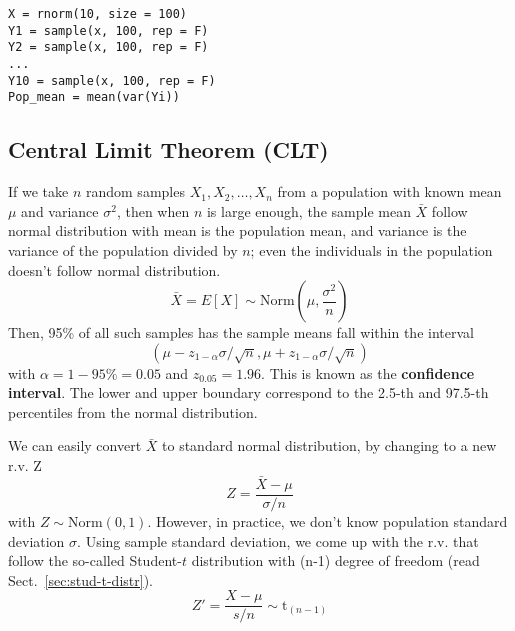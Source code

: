 \begin{lstlisting}
X = rnorm(10, size = 100)
Y1 = sample(x, 100, rep = F)
Y2 = sample(x, 100, rep = F)
...
Y10 = sample(x, 100, rep = F)
Pop_mean = mean(var(Yi))
\end{lstlisting}

\subsection{Central Limit Theorem (CLT)}
\label{sec:centr-limit-theor}

If we take $n$ random samples $X_1,X_2,\dots, X_n$ from a population
with known mean $\mu$ and variance $\sigma^2$, then when $n$ is large
enough, the sample mean $\bar{X}$ follow normal distribution with mean
is the population mean, and variance is the variance of the population
divided by $n$; even the individuals in the population doesn't follow
normal distribution.
\begin{equation}
  \label{eq:27}
  \bar{X} =  E[X]  \sim \text{Norm}(\mu,\frac{\sigma^2}{n})
\end{equation}
Then, 95\% of all such samples has the sample means fall within the
interval 
\begin{equation}
  \label{eq:37}
  (\mu- z_{1-\alpha} \sigma/\sqrt{n}, \mu+z_{1-\alpha} \sigma/\sqrt{n})
\end{equation}
with $\alpha=1-95\%=0.05$ and $z_{0.05}=1.96$. This is known as the
{\bf confidence interval}. The lower and upper boundary correspond to
the 2.5-th and 97.5-th percentiles from the normal distribution. 

We can easily convert $\bar{X}$ to standard normal distribution, by
changing to a new r.v. Z
\begin{equation}
  \label{eq:28}
  Z = \frac{\bar{X}-\mu}{\sigma/n}
\end{equation}
with $Z \sim \text{Norm}(0,1)$. However, in practice, we don't know
population standard deviation $\sigma$. Using sample standard
deviation, we come up with the r.v. that follow the so-called
Student-$t$ distribution with (n-1) degree of freedom (read
Sect.~\ref{sec:stud-t-distr}).
\begin{equation}
  \label{eq:29}
  Z' = \frac{X-\mu}{s/n} \sim \text{t}_{(n-1)}
\end{equation}


